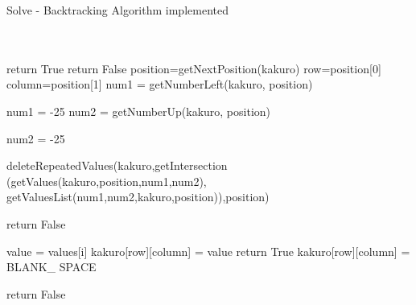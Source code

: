 \documentclass[conference]{IEEEtran}
\begin{document}
\begin{algorithm}
   \caption{Solve - Backtracking Algorithm implemented}
    \begin{algorithmic}[1]
      \\
		\\
		        \State return True
		    \Else
		    \EndIf
		        \State return False
 		 \Else
 		 \EndIf
		    \State position=getNextPosition(kakuro)
		    \State row=position[0]
		    \State column=position[1]
		    \State num1 = getNumberLeft(kakuro, position)
		    
		        \State num1 = -25
		    \EndIf
		    \State num2 = getNumberUp(kakuro, position)
		    
		        \State num2 = -25
		    \EndIf
		    
		    \State deleteRepeatedValues(kakuro,getIntersection
		    \State (getValues(kakuro,position,num1,num2),
		    \State getValuesList(num1,num2,kakuro,position)),position)
		    
		        \State return False
		    \EndIf
		    
		        \State value = values[i]
		        \State kakuro[row][column] = value
		            \State return True
		        \Else
		            \State kakuro[row][column] = BLANK\_ SPACE
		            \EndIf
		    \EndFor
		    
	\State return False

       \EndFunction
\end{algorithmic}
\end{algorithm}
\end{document}
